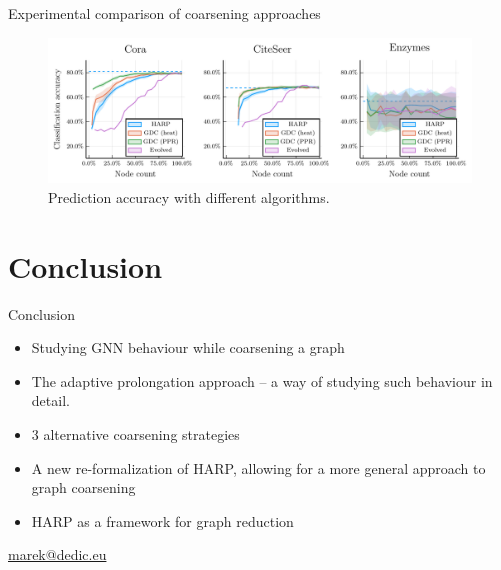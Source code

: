 \documentclass[10pt]{beamer}
\begin{document}
\begin{frame}{Experimental comparison of coarsening approaches}
	\begin{figure}
		\centering
		\includegraphics[width=\textwidth]{images/coarsening-algorithms/coarsening-algorithms.pdf}
		\caption{Prediction accuracy with different algorithms.}
	\end{figure}
\end{frame}

\section{Conclusion}

\begin{frame}{Conclusion}
	\centering
	\begin{itemize}
		\item Studying GNN behaviour while coarsening a graph
		\item The adaptive prolongation approach -- a way of studying such behaviour in detail.
		\item 3 alternative coarsening strategies
		\item A new re-formalization of HARP, allowing for a more general approach to graph coarsening
		\item HARP as a framework for graph reduction
	\end{itemize}
\end{frame}

\begin{frame}
	\titlepage
	\hfill{}\url{marek@dedic.eu}\hspace{1cm}
	\vspace{0.5cm}
\end{frame}
\end{document}

